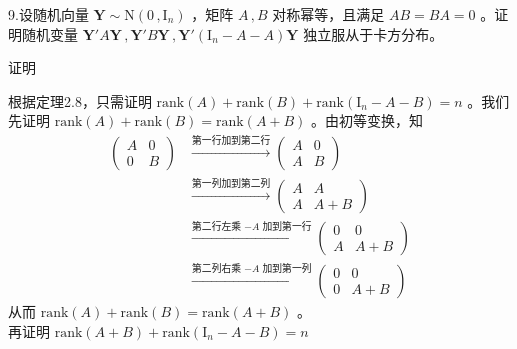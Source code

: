 \documentclass[12pt,hyperref,]{ctexart}
\begin{document}
\kaishu

9.设随机向量 \(\boldsymbol{Y}\sim\mathrm{N}(0\, ,\mathrm{I}_n)\) ，矩阵
\(A\, ,B\) 对称幂等，且满足 \(AB=BA=0\) 。证明随机变量
\(\boldsymbol{Y}'A\boldsymbol{Y}\, ,\boldsymbol{Y}'B\boldsymbol{Y}\, ,\boldsymbol{Y}'(\mathrm{I}_n-A-A)\boldsymbol{Y}\)
独立服从于卡方分布。

\vspace{1em}

\heiti

证明

\songti

根据定理2.8，只需证明
\(\mathrm{rank}(A)+\mathrm{rank}(B)+\mathrm{rank}(\mathrm{I}_n-A-B)=n\)
。我们先证明 \(\mathrm{rank}(A)+\mathrm{rank}(B)=\mathrm{rank}(A+B)\)
。由初等变换，知 \begin{equation*}
\begin{aligned}
\begin{pmatrix}
A & 0 \\
0 & B
\end{pmatrix} & \xrightarrow{\text{第一行加到第二行}}  
\begin{pmatrix}
A & 0 \\
A & B
\end{pmatrix} \\
& \xrightarrow{\text{第一列加到第二列}}
\begin{pmatrix}
A & A \\
A & A+B
\end{pmatrix} \\
& \xrightarrow{\text{第二行左乘 $-A$ 加到第一行}}
\begin{pmatrix}
0 & 0 \\
A & A+B
\end{pmatrix} \\
& \xrightarrow{\text{第二列右乘 $-A$ 加到第一列}}
\begin{pmatrix}
0 & 0 \\
0 & A+B
\end{pmatrix} 
\end{aligned}
\end{equation*}从而
\(\mathrm{rank}(A)+\mathrm{rank}(B)=\mathrm{rank}(A+B)\) 。\\
再证明 \(\mathrm{rank}(A+B)+\mathrm{rank}(\mathrm{I}_n-A-B)=n\)
\end{document}
